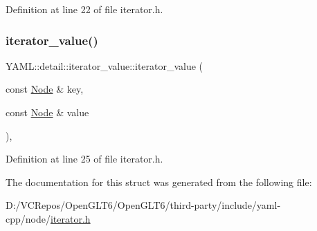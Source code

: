 Definition at line 22 of file iterator.\+h.

\mbox{\label{struct_y_a_m_l_1_1detail_1_1iterator__value_a2711429871915b88ce398cd19e8a65e1}} 
\subsubsection{\texorpdfstring{iterator\_value()}{iterator\_value()}\hspace{0.1cm}{\footnotesize\ttfamily [3/3]}}
{\footnotesize\ttfamily Y\+A\+M\+L\+::detail\+::iterator\+\_\+value\+::iterator\+\_\+value (\begin{DoxyParamCaption}\item[{const \mbox{\hyperlink{class_y_a_m_l_1_1_node}{Node}} \&}]{key,  }\item[{const \mbox{\hyperlink{class_y_a_m_l_1_1_node}{Node}} \&}]{value }\end{DoxyParamCaption})\hspace{0.3cm}{\ttfamily [inline]}, {\ttfamily [explicit]}}



Definition at line 25 of file iterator.\+h.



The documentation for this struct was generated from the following file\+:\begin{DoxyCompactItemize}
\item 
D\+:/\+V\+C\+Repos/\+Open\+G\+L\+T6/\+Open\+G\+L\+T6/third-\/party/include/yaml-\/cpp/node/\mbox{\hyperlink{iterator_8h}{iterator.\+h}}\end{DoxyCompactItemize}
